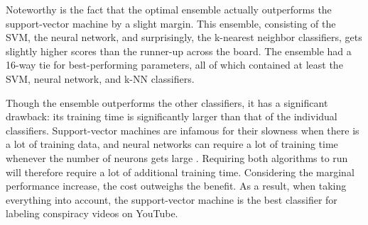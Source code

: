 \documentclass[../main.tex]{subfiles}
\begin{document}
Noteworthy is the fact that the optimal ensemble actually outperforms the support-vector machine by a slight margin. This ensemble, consisting of the SVM, the neural network, and surprisingly, the k-nearest neighbor classifiers, gets slightly higher scores than the runner-up across the board. The ensemble had a 16-way tie for best-performing parameters, all of which contained at least the SVM, neural network, and k-NN classifiers. 

Though the ensemble outperforms the other classifiers, it has a significant drawback: its training time is significantly larger than that of the individual classifiers. Support-vector machines are infamous for their slowness when there is a lot of training data, and neural networks can require a lot of training time whenever the number of neurons gets large \citep{burges1997improving, kamarthi1999accelerating}. Requiring both algorithms to run will therefore require a lot of additional training time. Considering the marginal performance increase, the cost outweighs the benefit. As a result, when taking everything into account, the support-vector machine is the best classifier for labeling conspiracy videos on YouTube.  
\end{document}

